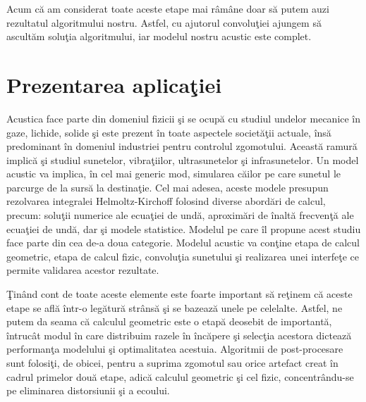 \bigskip 
Acum c\u{a} am considerat toate aceste etape mai r\^{a}m\^{a}ne doar s\u{a} putem auzi rezultatul algoritmului nostru. Astfel, cu ajutorul convolu\c{t}iei ajungem s\u{a} ascult\u{a}m solu\c{t}ia algoritmului, iar modelul nostru acustic este complet.

\section{Prezentarea aplica\c{t}iei}

	Acustica face parte din domeniul fizicii \c{s}i se ocup\u{a} cu studiul undelor mecanice \^{i}n gaze, lichide, solide \c{s}i este prezent \^{i}n toate aspectele societ\u{a}\c{t}ii actuale, \^{i}ns\u{a} predominant \^{i}n domeniul industriei pentru controlul zgomotului. Aceast\u{a} ramur\u{a} implic\u{a} \c{s}i studiul sunetelor, vibra\c{t}iilor, ultrasunetelor \c{s}i infrasunetelor. Un model acustic va implica, \^{i}n cel mai generic mod, simularea c\u{a}ilor pe care sunetul le parcurge de la surs\u{a} la destina\c{t}ie. Cel mai adesea, aceste modele presupun rezolvarea integralei Helmoltz-Kirchoff\cite{helmoltz} folosind diverse abord\u{a}ri de calcul, precum: solu\c{t}ii numerice ale ecua\c{t}iei de und\u{a}, aproxim\u{a}ri de \^{i}nalt\u{a} frecven\c{t}\u{a} ale ecua\c{t}iei de und\u{a}, dar \c{s}i modele statistice. Modelul pe care \^{i}l propune acest studiu face parte din cea de-a doua categorie. Modelul acustic va con\c{t}ine etapa de calcul geometric, etapa de calcul fizic, convolu\c{t}ia sunetului \c{s}i realizarea unei interfe\c{t}e ce permite validarea acestor rezultate.
	\bigskip
	
	\c{T}in\^{a}nd cont de toate aceste elemente este foarte important s\u{a} re\c{t}inem c\u{a} aceste etape se afl\u{a} \^{i}ntr-o leg\u{a}tur\u{a} str\^{a}ns\u{a} \c{s}i se bazeaz\u{a} unele pe celelalte. Astfel, ne putem da seama c\u{a} calculul geometric este o etap\u{a} deosebit de important\u{a}, \^{i}ntruc\^{a}t modul \^{i}n care distribuim razele \^{i}n \^{i}nc\u{a}pere \c{s}i selec\c{t}ia acestora dicteaz\u{a} performan\c{t}a modelului \c{s}i optimalitatea acestuia. Algoritmii de post-procesare sunt folosi\c{t}i, de obicei, pentru a suprima zgomotul sau orice artefact creat \^{i}n cadrul primelor dou\u{a} etape, adic\u{a} calculul geometric \c{s}i cel fizic, concentr\^{a}ndu-se pe eliminarea distorsiunii \c{s}i a ecoului.
	\bigskip
	
